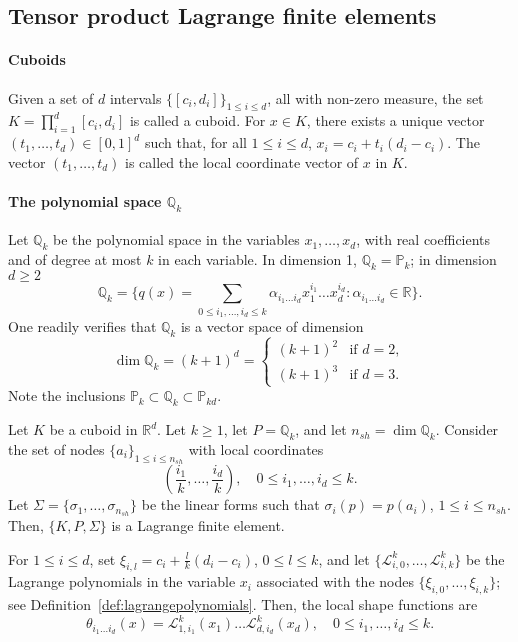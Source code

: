 \subsection{Tensor product Lagrange finite elements}
\paragraph{Cuboids}
Given a set of $d$ intervals $\{[c_i, d_i]\}_{1 \le i \le d}$, all with non-zero measure, the set $K = \prod_{i=1}^d [c_i, d_i]$ is called a cuboid. For $x \in K$, there exists a unique vector $(t_1, \dots, t_d) \in [0, 1]^d$ such that, for all $1 \le i \le d$, $x_i = c_i + t_i(d_i - c_i)$. The vector $(t_1, \dots, t_d)$ is called the local coordinate vector of $x$ in $K$.

\paragraph{The polynomial space $\mathbb{Q}_k$} Let $\mathbb{Q}_k$ be the polynomial space in the variables $x_1, \dots, x_d$, with real coefficients and of degree at most $k$ in each variable. In dimension 1, $\mathbb{Q}_k = \mathbb{P}_k$; in dimension $d \ge 2$
\begin{equation*}
\mathbb{Q}_k = \{ q(x) = \sum_{0 \le i_1, \dots, i_d \le k} \alpha_{i_1 \dots i_d} x_1^{i_1} \dots x_d^{i_d} : \alpha_{i_1 \dots i_d} \in \mathbb{R} \}.
\end{equation*}
One readily verifies that $\mathbb{Q}_k$ is a vector space of dimension
\begin{equation*}
\dim \mathbb{Q}_k = (k+1)^d = \begin{cases} (k+1)^2 & \text{if } d=2, \\ (k+1)^3 & \text{if } d=3. \end{cases}
\end{equation*}
Note the inclusions $\mathbb{P}_k \subset \mathbb{Q}_k \subset \mathbb{P}_{kd}$.

\begin{lemma}\label{lemma:tensor_product_lagrange_fe}
    Let $K$ be a cuboid in $\mathbb{R}^d$. Let $k \ge 1$, let $P = \mathbb{Q}_k$, and let $n_{sh} = \dim \mathbb{Q}_k$. Consider the set of nodes $\{a_i\}_{1 \le i \le n_{sh}}$ with local coordinates
    \begin{equation*}
\left(\frac{i_1}{k}, \dots, \frac{i_d}{k}\right), \quad 0 \le i_1, \dots, i_d \le k.
\end{equation*}
    Let $\Sigma = \{\sigma_1, \dots, \sigma_{n_{sh}}\}$ be the linear forms such that $\sigma_i(p) = p(a_i)$, $1 \le i \le n_{sh}$. Then, $\{K, P, \Sigma\}$ is a Lagrange finite element.
\end{lemma}
For $1 \le i \le d$, set $\xi_{i,l} = c_i + \frac{l}{k}(d_i - c_i)$, $0 \le l \le k$, and let $\{\mathcal{L}_{i,0}^k, \dots, \mathcal{L}_{i,k}^k\}$ be the Lagrange polynomials in the variable $x_i$ associated with the nodes $\{\xi_{i,0}, \dots, \xi_{i,k}\}$; see Definition~\ref{def:lagrangepolynomials}. Then, the local shape functions are
\begin{equation*}
\theta_{i_1 \dots i_d}(x) = \mathcal{L}_{1,i_1}^k(x_1) \dots \mathcal{L}_{d,i_d}^k(x_d), \quad 0 \le i_1, \dots, i_d \le k.
\end{equation*}

